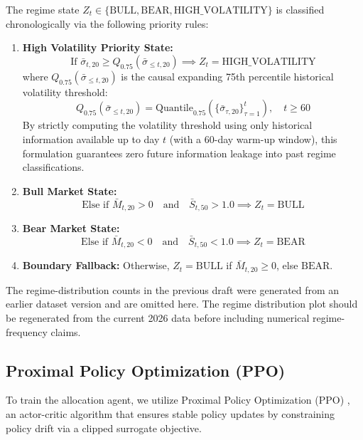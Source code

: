 \documentclass[conference]{IEEEtran}
\begin{document}
The regime state $Z_t \in \{\text{BULL}, \text{BEAR}, \text{HIGH\_VOLATILITY}\}$ is classified chronologically via the following priority rules:
\begin{enumerate}
    \item \textbf{High Volatility Priority State:}
    \begin{equation}
        \text{If } \bar{\sigma}_{t, 20} \ge Q_{0.75}(\bar{\sigma}_{\le t, 20}) \implies Z_t = \text{HIGH\_VOLATILITY}
    \end{equation}
    where $Q_{0.75}(\bar{\sigma}_{\le t, 20})$ is the causal expanding 75th percentile historical volatility threshold:
    \begin{equation}
        Q_{0.75}(\bar{\sigma}_{\le t, 20}) = \text{Quantile}_{0.75}\left( \{\bar{\sigma}_{\tau, 20}\}_{\tau=1}^t \right), \quad t \ge 60
    \end{equation}
    By strictly computing the volatility threshold using only historical information available up to day $t$ (with a 60-day warm-up window), this formulation guarantees zero future information leakage into past regime classifications.
    \item \textbf{Bull Market State:}
    \begin{equation}
        \text{Else if } \bar{M}_{t, 20} > 0 \quad \text{and} \quad \bar{S}_{t, 50} > 1.0 \implies Z_t = \text{BULL}
    \end{equation}
    \item \textbf{Bear Market State:}
    \begin{equation}
        \text{Else if } \bar{M}_{t, 20} < 0 \quad \text{and} \quad \bar{S}_{t, 50} < 1.0 \implies Z_t = \text{BEAR}
    \end{equation}
    \item \textbf{Boundary Fallback:} Otherwise, $Z_t = \text{BULL}$ if $\bar{M}_{t, 20} \ge 0$, else $\text{BEAR}$.
\end{enumerate}

The regime-distribution counts in the previous draft were generated from an earlier dataset version and are omitted here. The regime distribution plot should be regenerated from the current 2026 data before including numerical regime-frequency claims.

\subsection{Proximal Policy Optimization (PPO)}
To train the allocation agent, we utilize Proximal Policy Optimization (PPO) \cite{schulman2017proximal}, an actor-critic algorithm that ensures stable policy updates by constraining policy drift via a clipped surrogate objective. 
\end{document}
